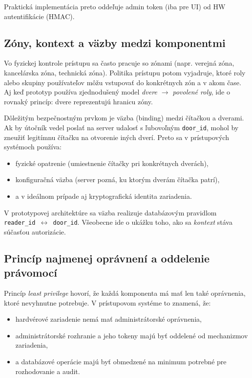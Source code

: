 \documentclass[journal,a4paper,onecolumn]{IEEEtran}
\begin{document}
Praktická implementácia preto oddeľuje admin token (iba pre UI) od HW autentifikácie (HMAC).

\subsection{Zóny, kontext a väzby medzi komponentmi}

Vo fyzickej kontrole prístupu sa často pracuje so zónami (napr. verejná zóna, kancelárska zóna, technická zóna). Politika prístupu potom vyjadruje, ktoré roly alebo skupiny používateľov môžu vstupovať do konkrétnych zón a v akom čase. Aj keď prototyp používa zjednodušený model \emph{dvere $\rightarrow$ povolené roly}, ide o rovnaký princíp: dvere reprezentujú hranicu zóny.

Dôležitým bezpečnostným prvkom je väzba (binding) medzi čítačkou a dverami. Ak by útočník vedel poslať na server udalosť s ľubovoľným \texttt{door\_id}, mohol by zneužiť legitímnu čítačku na otvorenie iných dverí. Preto sa v prístupových systémoch používa:

\begin{itemize}[leftmargin=*,itemsep=2pt]
  \item fyzické opatrenie (umiestnenie čítačky pri konkrétnych dverách),
  \item konfiguračná väzba (server pozná, ku ktorým dverám čítačka patrí),
  \item a v ideálnom prípade aj kryptografická identita zariadenia.
\end{itemize}

V prototypovej architektúre sa väzba realizuje databázovým pravidlom \texttt{reader\_id $\leftrightarrow$ door\_id}. Všeobecne ide o ukážku toho, ako sa \emph{kontext} stáva súčasťou autorizácie.

\subsection{Princíp najmenej oprávnení a oddelenie právomocí}

Princíp \emph{least privilege} hovorí, že každá komponenta má mať len také oprávnenia, ktoré nevyhnutne potrebuje. V prístupovom systéme to znamená, že:

\begin{itemize}[leftmargin=*,itemsep=2pt]
  \item hardvérové zariadenie nemá mať administrátorské oprávnenia,
  \item administrátorské rozhranie a jeho tokeny majú byť oddelené od mechanizmov zariadenia,
  \item a databázové operácie majú byť obmedzené na minimum potrebné pre rozhodovanie a audit.
\end{itemize}
\end{document}
